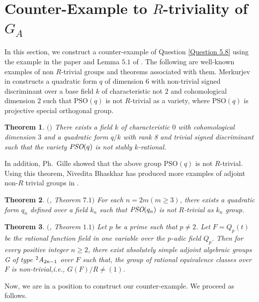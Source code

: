 \documentclass[12pt]{amsart}
\newtheorem{theorem}{Theorem}[section]
\theoremstyle{definition}
\numberwithin{equation}{section}
\begin{document}
\section{Counter-Example to $R$-triviality of $G_A$}\label{counter}
\vskip2mm 
\noindent
In this section, we construct a counter-example of Question \ref{Question 5.8} using the example in the paper \cite{Gille2} and Lemma $5.1$ of \cite{GG}. The following are well-known examples of non $R$-trivial groups and theorems associated with them. 
\vskip2mm
\noindent
Merkurjev in \cite{AM2} constructs a quadratic form $q$ of dimension $6$ with non-trivial signed discriminant over a base field $k$ of characteristic not $2$ and cohomological dimension $2$ such that $\text{PSO}(q)$ is not $R$-trivial as a variety, where $\text{PSO}(q)$ is projective special orthogonal group.

\vskip2mm
\begin{theorem}\label{Theorem 6.1}
$($\cite{Gille2}$)$ There exists a field $k$ of characteristic $0$ with cohomological dimension $3$ and a quadratic form $q/k$ with rank 8 and trivial signed discriminant such that the variety $\emph{PSO}(q)$ is not stably $k$-rational.
\end{theorem}
\par 
\noindent
In addition, Ph.~Gille showed that the above group $\text{PSO}(q)$ is not $R$-trivial. Using this theorem, Nivedita Bhaskhar has produced more examples of adjoint non-$R$ trivial groups in \cite{Nivedita}.


\vskip2mm

\begin{theorem}\label{Theorem 6.2}
$($\cite{Nivedita}, \emph{Theorem} $7.1)$ For each $n=2m (m\geq 3)$, there exists a quadratic form $q_n$ defined over a field $k_n$ such that $\emph{PSO}(q_n)$ is not $R$-trivial as $k_n$ group.
\end{theorem}

\vskip2mm

\begin{theorem}\label{Theorem 6.3}
$($\cite{Preeti}, \emph{Theorem} $1.1)$ Let $p$ be a prime such that $p\neq 2$. Let $F=Q_p(t)$ be the rational function field in one variable over the $p$-adic field $Q_p$. Then for every positive integer $n\geq 2$, there exist absolutely simple adjoint algebraic groups G of type $^{2}\emph{A}_{2n-1}$
 over $F$ such that, the group of rational equivalence classes over $F$ is non-trivial,i.e., $G(F)/R \neq (1)$.
\end{theorem}
\vskip 2mm
\noindent
Now, we are in a position to construct our counter-example. We proceed as follows.
\end{document}
